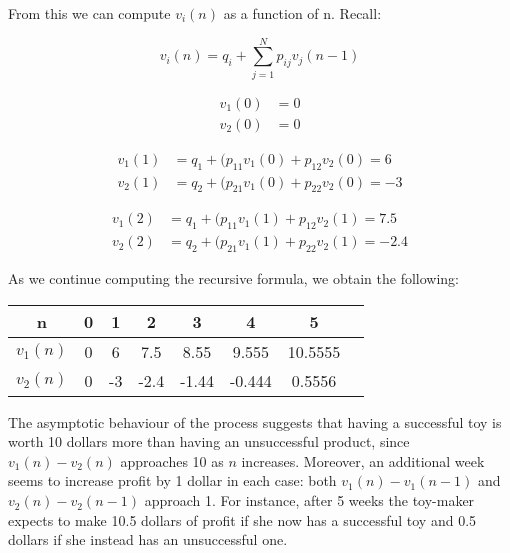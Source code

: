 \documentclass[\main/main.tex]{subfiles}
\begin{document}
\begin{small}
\noindent From this we can compute $v_i(n)$ as a function of n. Recall:

\begin{equation}
    v_i(n) = q_i + \sum_{j=1}^N p_{ij}v_j(n-1) 
\end{equation}


\begin{equation}
\begin{split}
     v_1(0) &= 0\\ 
     v_2(0) &= 0 
\end{split}
\end{equation}


\begin{equation}
\begin{split}
     v_1(1) &= q_1 + (p_{11}v_1(0) +p_{12}v_2(0) = 6  \\ 
     v_2(1) &= q_2 + (p_{21}v_1(0) +p_{22}v_2(0) = -3
\end{split}
\end{equation}

\begin{equation}
\begin{split}
     v_1(2) &= q_1 + (p_{11}v_1(1) +p_{12}v_2(1) = 7.5  \\ 
     v_2(2) &= q_2 + (p_{21}v_1(1) +p_{22}v_2(1) = -2.4
\end{split}
\end{equation}

\noindent As we continue computing the recursive formula, we obtain the following:

\begin{center} 
\begin{tabular}{ c|c|c|c|c|c|c|c  } 
 n & 0 & 1 & 2 & 3& 4 & 5 & \\ 
 \hline
 $v_1(n)$ & 0& 6& 7.5& 8.55& 9.555&10.5555 \\ 
 $v_2(n)$  & 0 & -3  & -2.4 & -1.44 &-0.444 & 0.5556\\ 
\end{tabular}
\end{center}

The asymptotic behaviour of the process suggests that having a successful toy is worth 10 dollars more than having an unsuccessful product, since $v_1(n) - v_2(n)$ approaches 10 as $n$ increases. Moreover, an additional week seems to increase profit by  1 dollar in each case: both $v_1(n) - v_1(n-1)$ and $v_2(n) - v_2(n-1)$ approach 1. For instance, after 5 weeks the toy-maker expects to make 10.5 dollars of profit if she now has a successful toy and 0.5 dollars if she instead has an unsuccessful one.
\end{small}
\end{document}
